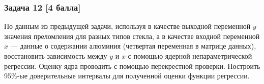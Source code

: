 \documentclass{article}
\theoremstyle{plain}
\begin{document}
\subsubsection*{Задача 12 [4 балла]}
По данным из предыдущей задачи, используя в качестве выходной переменной $y$ значения преломления для разных типов стекла, а в качестве входной переменной $x$ --- данные о содержании алюминия (четвертая переменная в матрице данных), восстановить зависимость между $y$ и $x$ с помощью ядерной непараметрической регрессии. Оценку ядра проводить с помощью перекрестной проверки. Построить 95\%-ые доверительные интервалы для полученной оценки функции регрессии.
\end{document}
